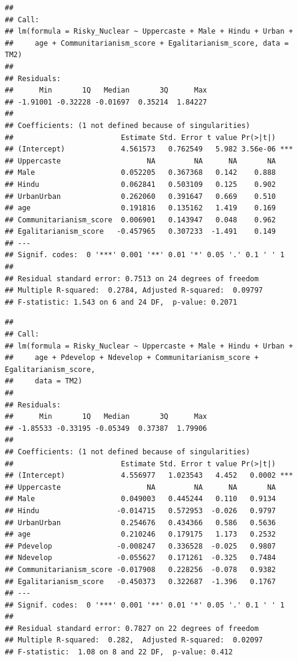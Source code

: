 \documentclass[
]{article}
\begin{document}
\begin{verbatim}
## 
## Call:
## lm(formula = Risky_Nuclear ~ Uppercaste + Male + Hindu + Urban + 
##     age + Communitarianism_score + Egalitarianism_score, data = TM2)
## 
## Residuals:
##      Min       1Q   Median       3Q      Max 
## -1.91001 -0.32228 -0.01697  0.35214  1.84227 
## 
## Coefficients: (1 not defined because of singularities)
##                         Estimate Std. Error t value Pr(>|t|)    
## (Intercept)             4.561573   0.762549   5.982 3.56e-06 ***
## Uppercaste                    NA         NA      NA       NA    
## Male                    0.052205   0.367368   0.142    0.888    
## Hindu                   0.062841   0.503109   0.125    0.902    
## UrbanUrban              0.262060   0.391647   0.669    0.510    
## age                     0.191816   0.135162   1.419    0.169    
## Communitarianism_score  0.006901   0.143947   0.048    0.962    
## Egalitarianism_score   -0.457965   0.307233  -1.491    0.149    
## ---
## Signif. codes:  0 '***' 0.001 '**' 0.01 '*' 0.05 '.' 0.1 ' ' 1
## 
## Residual standard error: 0.7513 on 24 degrees of freedom
## Multiple R-squared:  0.2784, Adjusted R-squared:  0.09797 
## F-statistic: 1.543 on 6 and 24 DF,  p-value: 0.2071
\end{verbatim}

\begin{verbatim}
## 
## Call:
## lm(formula = Risky_Nuclear ~ Uppercaste + Male + Hindu + Urban + 
##     age + Pdevelop + Ndevelop + Communitarianism_score + Egalitarianism_score, 
##     data = TM2)
## 
## Residuals:
##      Min       1Q   Median       3Q      Max 
## -1.85533 -0.33195 -0.05349  0.37387  1.79906 
## 
## Coefficients: (1 not defined because of singularities)
##                         Estimate Std. Error t value Pr(>|t|)    
## (Intercept)             4.556977   1.023543   4.452   0.0002 ***
## Uppercaste                    NA         NA      NA       NA    
## Male                    0.049003   0.445244   0.110   0.9134    
## Hindu                  -0.014715   0.572953  -0.026   0.9797    
## UrbanUrban              0.254676   0.434366   0.586   0.5636    
## age                     0.210246   0.179175   1.173   0.2532    
## Pdevelop               -0.008247   0.336528  -0.025   0.9807    
## Ndevelop               -0.055627   0.171261  -0.325   0.7484    
## Communitarianism_score -0.017908   0.228256  -0.078   0.9382    
## Egalitarianism_score   -0.450373   0.322687  -1.396   0.1767    
## ---
## Signif. codes:  0 '***' 0.001 '**' 0.01 '*' 0.05 '.' 0.1 ' ' 1
## 
## Residual standard error: 0.7827 on 22 degrees of freedom
## Multiple R-squared:  0.282,  Adjusted R-squared:  0.02097 
## F-statistic:  1.08 on 8 and 22 DF,  p-value: 0.412
\end{verbatim}
\end{document}
